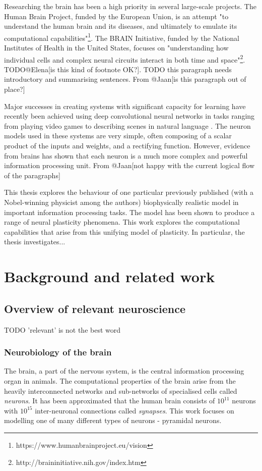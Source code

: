 \documentclass[a4paper,12pt]{report}
\theoremstyle{definition}
\begin{document}
Researching the brain has been a high priority in several large-scale projects. The Human Brain Project, funded by the European Union, is an attempt "to understand the human brain and its diseases, and ultimately to emulate its computational capabilities"\footnote{https://www.humanbrainproject.eu/vision}. The BRAIN Initiative, funded by the National Institutes of Health in the United States, focuses on "understanding how individual cells and complex neural circuits interact in both time and space"\footnote{http://braininitiative.nih.gov/index.htm}. TODO@Elena[is this kind of footnote OK?]. TODO this paragraph needs introductory and summarising sentences. From @Jaan[is this paragraph out of place?]

Major successes in creating systems with significant capacity for learning have recently been achieved using deep convolutional neural networks in tasks ranging from playing video games \cite{mnih2015human} to describing scenes in natural language \cite{karpathy2014deep}. The neuron models used in these systems are very simple, often composing of a scalar product of the inputs and weights, and a rectifying function. However, evidence from brains has shown that each neuron is a much more complex and powerful information processing unit.
From @Jaan[not happy with the current logical flow of the paragraphs]

This thesis explores the behaviour of one particular previously published (with a Nobel-winning physicist among the authors) biophysically realistic model in important information processing tasks. The model has been shown to produce a range of neural plasticity phenomena. This work explores the computational capabilities that arise from this unifying model of plasticity. In particular, the thesis investigates...



\chapter{Background and related work}


\section{Overview of relevant neuroscience}
TODO 'relevant' is not the best word

\subsection{Neurobiology of the brain}
The brain, a part of the nervous system, is the central information processing organ in animals. The computational properties of the brain arise from the heavily interconnected networks and sub-networks of specialised cells called \emph{neurons}. It has been approximated \cite{herculano2009human} that the human brain consists of $10^{11}$ neurons with $10^{15}$ inter-neuronal connections called \emph{synapses}. This work focuses on modelling one of many different types of neurons - pyramidal neurons.
\end{document}
